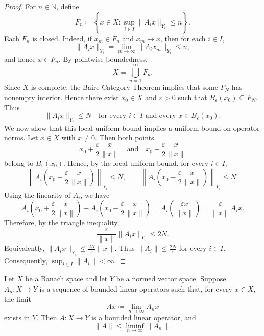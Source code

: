 \begin{proof}
    For \(n \in \mathbb{N}\), define
    \[
        F_n \coloneqq \left\{ x \in X : \sup_{i \in I} \lVert A_i x \rVert_{Y_i} \leq n \right\}.
    \]
    Each \(F_n\) is closed. Indeed, if \(x_m \in F_n\) and \(x_m \to x\), then for each \(i \in I\),
    \[
        \lVert A_i x \rVert_{Y_i} = \lim_{m \to \infty} \lVert A_i x_m \rVert_{Y_i} \leq n,
    \]
    and hence \(x \in F_n\). By pointwise boundedness,
    \[
        X = \bigcup_{n=1}^{\infty} F_n.
    \]
    Since \(X\) is complete, the Baire Category Theorem implies that some \(F_N\) has nonempty interior. Hence there exist \(x_0 \in X\) and \(\varepsilon > 0\) such that \(B_\varepsilon(x_0) \subseteq F_N\). Thus
    \[
        \lVert A_i x \rVert_{Y_i} \leq N \quad \text{for every } i \in I \text{ and every } x \in B_\varepsilon(x_0).
    \]
    We now show that this local uniform bound implies a uniform bound on operator norms. Let \(x \in X\) with \(x \neq 0\). Then both points
    \[
        x_0 + \frac{\varepsilon}{2} \frac{x}{\lVert x \rVert} \quad \text{and} \quad x_0 - \frac{\varepsilon}{2} \frac{x}{\lVert x \rVert}
    \]
    belong to \(B_\varepsilon(x_0)\). Hence, by the local uniform bound, for every \(i \in I\),
    \[
        \left\lVert A_i \!\left( x_0 + \frac{\varepsilon}{2} \frac{x}{\lVert x \rVert} \right) \right\rVert_{Y_i} \leq N, \qquad \left\lVert A_i \!\left( x_0 - \frac{\varepsilon}{2} \frac{x}{\lVert x \rVert} \right) \right\rVert_{Y_i} \leq N.
    \]
    Using the linearity of \(A_i\), we have
    \[
        A_i \!\left( x_0 + \frac{\varepsilon}{2} \frac{x}{\lVert x \rVert} \right) - A_i \!\left( x_0 - \frac{\varepsilon}{2} \frac{x}{\lVert x \rVert} \right) = A_i \!\left( \frac{\varepsilon x}{\lVert x \rVert} \right) = \frac{\varepsilon}{\lVert x \rVert} A_i x.
    \]
    Therefore, by the triangle inequality,
    \[
        \frac{\varepsilon}{\lVert x \rVert} \lVert A_i x \rVert_{Y_i} \leq 2N.
    \]
    Equivalently, \(\lVert A_i x \rVert_{Y_i} \leq \frac{2N}{\varepsilon} \lVert x \rVert\). Thus \(\lVert A_i \rVert \leq \frac{2N}{\varepsilon}\) for every \(i \in I\). Consequently, \(\sup_{i \in I} \lVert A_i \rVert < \infty\).
\end{proof}

\begin{corollary} \label{cl: pointwise limits of bounded operators}
    Let \(X\) be a Banach space and let \(Y\) be a normed vector space. Suppose \(A_n : X \to Y\) is a sequence of bounded linear operators such that, for every \(x \in X\), the limit
    \[
        Ax \coloneqq \lim_{n \to \infty} A_n x
    \]
    exists in \(Y\). Then \(A : X \to Y\) is a bounded linear operator, and
    \[
        \lVert A \rVert \leq \liminf_{n \to \infty} \lVert A_n \rVert.
    \]
\end{corollary}

